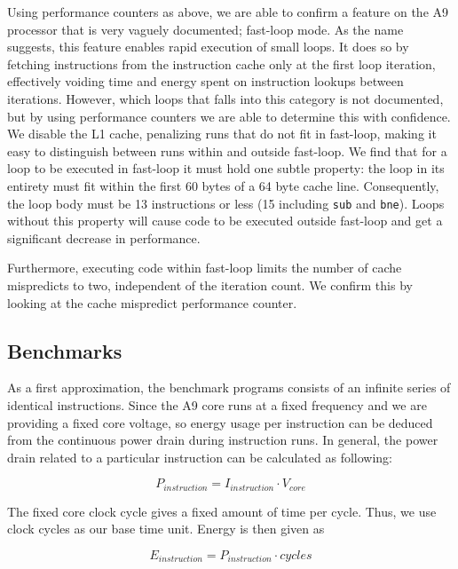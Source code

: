 Using performance counters as above, we are able to confirm a feature on the A9
processor that is very vaguely documented; fast-loop mode. As the name suggests,
this feature enables rapid execution of small loops. It does so by fetching
instructions from the instruction cache only at the first loop iteration,
effectively voiding time and energy spent on instruction lookups between
iterations. However, which loops that falls into this category is not
documented, but by using performance counters we are able to determine this with
confidence. We disable the L1 cache, penalizing runs that do not fit in
fast-loop, making it easy to distinguish between runs within and outside
fast-loop. We find that for a loop to be executed in fast-loop it must hold one
subtle property: the loop in its entirety must fit within the first 60 bytes of
a 64 byte cache line. Consequently, the loop body must be 13 instructions or
less (15 including \texttt{sub} and \texttt{bne}). Loops without this property
will cause code to be executed outside fast-loop and get a significant decrease
in performance.

Furthermore, executing code within fast-loop limits the number of cache
mispredicts to two, independent of the iteration count. We confirm this by
looking at the cache mispredict performance counter.

\subsection{Benchmarks}
As a first approximation, the benchmark programs consists of an infinite series
of identical instructions. Since the A9 core runs at a fixed frequency and we are
providing a fixed core voltage, so energy usage per instruction can
be deduced from the continuous power drain during instruction runs. In general,
the power drain related to a particular instruction can be calculated as following:

\begin{equation}
    P_{instruction} = I_{instruction} \cdot V_{core}
    \label{eq:1}
\end{equation}

The fixed core clock cycle gives a fixed amount of time per cycle. Thus, we
use clock cycles as our base time unit. Energy is then given as

\begin{equation}
    E_{instruction} = P_{instruction} \cdot cycles
    \label{eq:2}
\end{equation}

